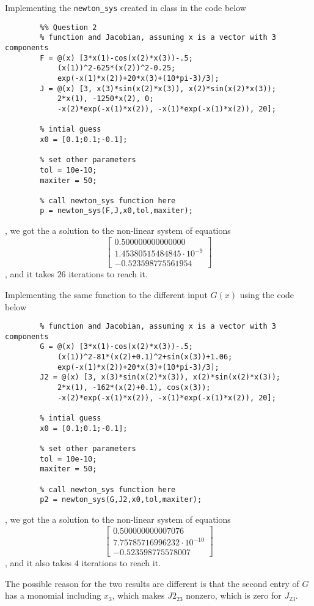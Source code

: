\begin{answer}
    Implementing the \verb+newton_sys+ created in class in the code below 
    \begin{verbatim}
        %% Question 2
        % function and Jacobian, assuming x is a vector with 3 components
        F = @(x) [3*x(1)-cos(x(2)*x(3))-.5;
            (x(1))^2-625*(x(2))^2-0.25;
            exp(-x(1)*x(2))+20*x(3)+(10*pi-3)/3];
        J = @(x) [3, x(3)*sin(x(2)*x(3)), x(2)*sin(x(2)*x(3));
            2*x(1), -1250*x(2), 0;
            -x(2)*exp(-x(1)*x(2)), -x(1)*exp(-x(1)*x(2)), 20];
        
        % intial guess
        x0 = [0.1;0.1;-0.1];
        
        % set other parameters
        tol = 10e-10;
        maxiter = 50;
        
        % call newton_sys function here
        p = newton_sys(F,J,x0,tol,maxiter);
    \end{verbatim}
    , we got the a solution to the non-linear system of equations
    \begin{equation}
        \left[\begin{matrix}
            0.500000000000000\\
            1.45380515484845 \cdot 10^{-9}\\
            -0.523598775561954
        \end{matrix}\right]
    \end{equation}
    , and it takes $26$ iterations to reach it.
    
    Implementing the same function to the different input $G(x)$ using the code below
    \begin{verbatim}
        % function and Jacobian, assuming x is a vector with 3 components
        G = @(x) [3*x(1)-cos(x(2)*x(3))-.5;
            (x(1))^2-81*(x(2)+0.1)^2+sin(x(3))+1.06;
            exp(-x(1)*x(2))+20*x(3)+(10*pi-3)/3];
        J2 = @(x) [3, x(3)*sin(x(2)*x(3)), x(2)*sin(x(2)*x(3));
            2*x(1), -162*(x(2)+0.1), cos(x(3));
            -x(2)*exp(-x(1)*x(2)), -x(1)*exp(-x(1)*x(2)), 20];
        
        % intial guess
        x0 = [0.1;0.1;-0.1];
        
        % set other parameters
        tol = 10e-10;
        maxiter = 50;
        
        % call newton_sys function here
        p2 = newton_sys(G,J2,x0,tol,maxiter);
    \end{verbatim}
    , we got the a solution to the non-linear system of equations
    \begin{equation}
        \left[\begin{matrix}
            0.500000000007076\\
            7.75785716996232 \cdot 10^{-10}\\
            -0.523598775578007
        \end{matrix}\right]
    \end{equation}
    , and it also takes $4$ iterations to reach it.
    
    The possible reason for the two results are different is that the second entry of $G$ has a monomial including $x_3$, which makes $J2_{23}$ nonzero, which is zero for $J_{23}$.
\end{answer}